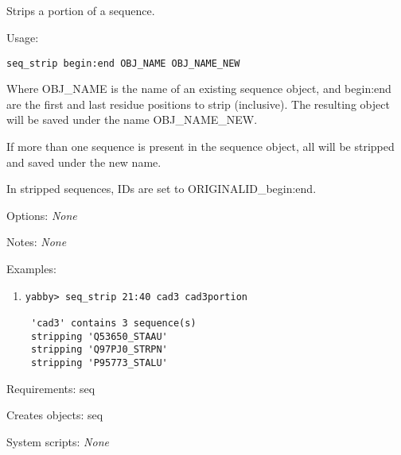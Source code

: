 


\subsection[seq\_strip]{  }



Strips a portion of a sequence.


\begin{description}


\item{Usage:}

{\tt seq\_strip begin:end OBJ\_NAME OBJ\_NAME\_NEW}

Where OBJ\_NAME is the name of an existing sequence object, and
begin:end are the first and last residue positions to strip (inclusive).
The resulting object will be saved under the name OBJ\_NAME\_NEW.

If more than one sequence is present in the sequence object,
all will be stripped and saved under the new name.

In stripped sequences, IDs are set to ORIGINALID\_begin:end.


\item{Options:} {\em None}


\item{Notes:} {\em None}


\item{Examples:}
\begin{enumerate}

\item
\begin{verbatim}
yabby> seq_strip 21:40 cad3 cad3portion

 'cad3' contains 3 sequence(s)
 stripping 'Q53650_STAAU'
 stripping 'Q97PJ0_STRPN'
 stripping 'P95773_STALU'

\end{verbatim}

\end{enumerate}


\item{Requirements:} seq


\item{Creates objects:} seq


\item{System scripts:} {\em None}

\end{description}

